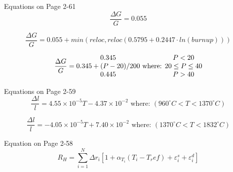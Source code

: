 \documentclass[12pt]{article}
\begin{document}
Equations on Page 2-61
\begin{equation}
\frac{{\Delta}G}{G}=0.055
\end{equation}

\begin{equation}
\frac{{\Delta}G}{G}=0.055+min\left(reloc,reloc\left(0.5795+0.2447 \cdot ln\left( burnup \right)\right)\right)
\end{equation}

\begin{equation}
\frac{{\Delta}G}{G}= \mqty{{0.345} \\{0.345+(P-20)/200}\\{0.445}} \text{ where: } \mqty{{P<20} \\{20\leq P \leq 40}\\{P > 40}}
\end{equation}

Equations on Page 2-59
\begin{equation}
\frac{{\Delta}l}{l}=4.55 \times 10^{-5} T-4.37 \times 10^{-2} \text{ where: } \left( 960^{\circ}C<T<1370^{\circ}C \right)
\end{equation}

\begin{equation}
\frac{{\Delta}l}{l}=-4.05 \times 10^{-5} T+7.40 \times 10^{-2}\text{ where: } \left( 1370^{\circ}C<T<1832^{\circ}C \right)
\end{equation}

Equation on Page 2-58
\begin{equation}
R_{H}=\sum\limits_{i=1}^N \Delta r_i \left[ 1+\alpha_{T_i} \left( T_i - T_ref \right) + \varepsilon_{i}^s + \varepsilon_{i}^d \right]
\end{equation}
\end{document}
